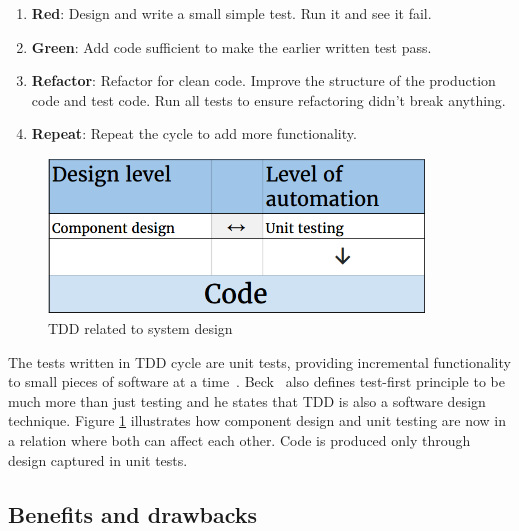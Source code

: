     \begin{enumerate}
    \item \textbf{Red}: Design and write a small simple test. Run it and see it fail.
    \item \textbf{Green}: Add code sufficient to make the earlier written test pass.
    \item \textbf{Refactor}: Refactor for clean code. Improve the structure of the production code and test code.
    Run all tests to ensure refactoring didn't break anything.
    \item \textbf{Repeat}: Repeat the cycle to add more functionality.
    \end{enumerate}
    \begin{figure}[ht]
      \begin{center}
        \includegraphics[width=10.0cm]{images/tdd.png}
        \caption{TDD related to system design}
        \label{fig:TDD}
      \end{center}
    \end{figure}
    The tests written in TDD cycle are unit tests, providing incremental functionality to small pieces of software at a time~\cite{bissi2016effects}.
    Beck~\cite{beck2001aim} also defines test-first principle to be much more than just testing and he states that TDD is
    also a software design technique. Figure \ref{fig:TDD} illustrates how component design and unit testing are now in a relation
    where both can affect each other. Code is produced only through design captured in unit tests.

    \subsection{Benefits and drawbacks}

